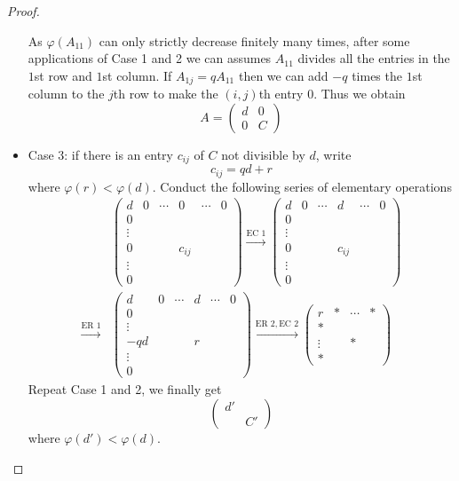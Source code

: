 \documentclass[a4paper]{article}
\theoremstyle{definition}
\begin{document}
\begin{proof}
\begin{itemize}
    As \(\varphi(A_{11})\) can only strictly decrease finitely many times, after some applications of Case 1 and 2 we can assumes \(A_{11}\) divides all the entries in the \(1\)st row and \(1\)st column. If \(A_{1j} = q A_{11}\) then we can add \(-q\) times the \(1\)st column to the \(j\)th row to make the \((i, j)\)th entry \(0\). Thus we obtain
    \[
      A =
      \begin{pmatrix}
        d & 0 \\
        0 & C
      \end{pmatrix}
    \]
  \item Case 3: if there is an entry \(c_{ij}\) of \(C\) not divisible by \(d\), write
    \[
      c_{ij} = qd + r
    \]
    where \(\varphi(r) < \varphi(d)\). Conduct the following series of elementary operations
    \begin{align*}
      &
        \begin{pmatrix}
          d & 0 & \cdots & 0 & \cdots & 0 \\
          0 \\
          \vdots \\
          0 & & & c_{ij} \\
          \vdots \\
          0
        \end{pmatrix}
      \stackrel{\text{EC } 1}{\to}
      \begin{pmatrix}
        d & 0 & \cdots & d & \cdots & 0 \\
        0 \\
        \vdots \\
        0 & & & c_{ij} \\
        \vdots \\
        0
      \end{pmatrix}
      \\
      \stackrel{\text{ER } 1}{\to}&
      \begin{pmatrix}
        d & 0 & \cdots & d & \cdots & 0 \\
        0 \\
        \vdots \\
        -qd & & & r \\
        \vdots \\
        0
      \end{pmatrix}
      \stackrel{\text{ER } 2, \text{EC } 2}{\to}
      \begin{pmatrix}
        r & * & \cdots & * \\
        * \\
        \vdots & & * \\
        *
      \end{pmatrix}
    \end{align*}
    Repeat Case 1 and 2, we finally get
    \[
      \begin{pmatrix}
        d' \\
        & C'
      \end{pmatrix}
    \]
    where \(\varphi(d') < \varphi(d)\).
  \end{itemize}


\end{proof}
\end{document}
